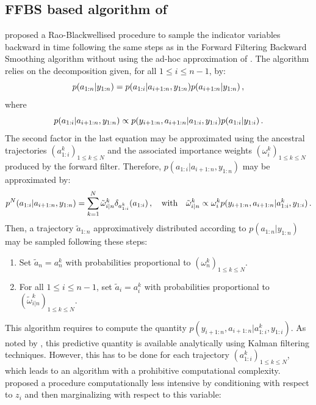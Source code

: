 \subsection{FFBS based algorithm of \cite{lindsten:bunch:sarkka:schon:godsill:2015,sarkka:bunch:godsill:2012,lindsten:bunch:godsill:schon:2013}}
\cite{lindsten:bunch:sarkka:schon:godsill:2015,sarkka:bunch:godsill:2012,lindsten:bunch:godsill:schon:2013} proposed a Rao-Blackwellised procedure to sample the indicator variables backward in time following the same steps as in the Forward Filtering Backward Smoothing algorithm \cite{huerzeler:kunsch:1998,doucet:godsill:andrieu:2000} without using the ad-hoc approximation of \cite{kim:1994}. The algorithm relies on the decomposition given, for all $1\le i \le n-1$, by:
\[
p(a_{1:n}|y_{1:n}) = p(a_{1:i}|a_{i+1:n},y_{1:n})p(a_{i+1:n}|y_{1:n})\,,
\]
where
\[
p(a_{1:i}|a_{i+1:n},y_{1:n}) \propto p(y_{i+1:n},a_{i+1:n}|a_{1:i},y_{1:i})p(a_{1:i}|y_{1:i})\,.
\]
The second factor in the last equation may be approximated using the ancestral  trajectories $(a^k_{1:i})_{1\le k \le N}$ and the associated importance weights $(\omega^k_{i})_{1\le k \le N}$ produced by the forward filter. Therefore, $p(a_{1:i}|a_{i+1:n},y_{1:n})$ may be approximated by:
\[
p^N(a_{1:i}|a_{i+1:n},y_{1:n}) = \sum_{k=1}^N \tilde{\omega}^k_{i|n}\delta_{a^k_{1:i}}(a_{1:i})\,, \quad \text{with} \quad \tilde{\omega}^k_{i|n} \propto \omega_i^k p(y_{i+1:n},a_{i+1:n}|a^k_{1:i},y_{1:i}) \,.
\]
Then, a trajectory $\tilde{a}_{1:n}$ approximatively distributed according to $p(a_{1:n}|y_{1:n})$ may be sampled following these steps:
\begin{enumerate}[-]
\item Set $\tilde{a}_n= a_n^k$ with probabilities proportional to $(\omega_n^k)_{1\le k \le N}$.
\item For all $1\le i\le n-1$, set $\tilde{a}_i = a_i^k$ with probabilities proportional to $(\tilde{\omega}_{i|n}^k)_{1\le k \le N}$.
\end{enumerate}
This algorithm requires to compute the quantity  $p(y_{i+1:n},a_{i+1:n}|a^k_{1:i},y_{1:i})$. As noted by \cite{lindsten:bunch:sarkka:schon:godsill:2015}, this predictive quantity is available analytically using  Kalman filtering techniques. However, this has to be done for each trajectory $(a^k_{1:i})_{1\le k \le N}$, which leads to an algorithm with a prohibitive computational complexity. \cite{lindsten:bunch:sarkka:schon:godsill:2015} proposed a procedure computationally less intensive by conditioning with respect to $z_i$ and then marginalizing with respect to this variable:
